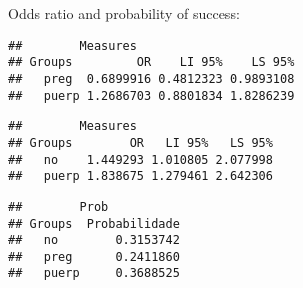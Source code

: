 \documentclass[
]{article}
\newenvironment{Shaded}{\begin{snugshade}}{\end{snugshade}}
\newcommand{\CommentTok}[1]{\textcolor[rgb]{0.56,0.35,0.01}{\textit{#1}}}
\newcommand{\KeywordTok}[1]{\textcolor[rgb]{0.13,0.29,0.53}{\textbf{#1}}}
\newcommand{\NormalTok}[1]{#1}
\newcommand{\OperatorTok}[1]{\textcolor[rgb]{0.81,0.36,0.00}{\textbf{#1}}}
\begin{document}
Odds ratio and probability of success:

\begin{Shaded}
\end{Shaded}

\begin{verbatim}
##        Measures
## Groups         OR    LI 95%    LS 95%
##   preg  0.6899916 0.4812323 0.9893108
##   puerp 1.2686703 0.8801834 1.8286239
\end{verbatim}

\begin{Shaded}
\end{Shaded}

\begin{verbatim}
##        Measures
## Groups        OR   LI 95%   LS 95%
##   no    1.449293 1.010805 2.077998
##   puerp 1.838675 1.279461 2.642306
\end{verbatim}

\begin{Shaded}
\end{Shaded}

\begin{verbatim}
##        Prob
## Groups  Probabilidade
##   no        0.3153742
##   preg      0.2411860
##   puerp     0.3688525
\end{verbatim}
\end{document}
